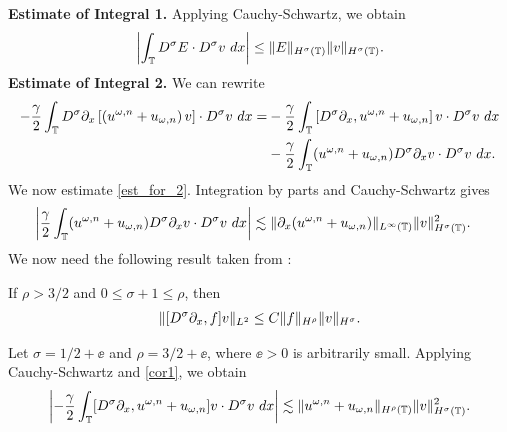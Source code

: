\textbf{Estimate of Integral 1.} Applying Cauchy-Schwartz, we obtain
%
%
\begin{equation}
\begin{split}
\left |\int_{\mathbb{T}} D^\sigma E \cdot D^\sigma v \ dx \right |
 \le \|E\|_{H^\sigma(\mathbb{T})} \|v\|_{H^\sigma(\mathbb{T})}.
\label{est_for_1}
\end{split}
\end{equation}
%
%
%
\textbf{Estimate of Integral 2.} We can rewrite
%
%
\begin{equation}
\begin{split}
-\frac{\gamma}{2} \int_{\mathbb{T}} D^\sigma \partial_x \left[ \left( u^{\omega,n} + 
u_{\omega,n}
\right)v \right] \cdot D^\sigma v \ dx
 = & -\frac{\gamma}{2}\int_{\mathbb{T}} \left[ D^\sigma \partial_x , u^{\omega,n} + 
u_{\omega,n}
\right]v \cdot D^\sigma v \ dx
\\
& - \frac{\gamma}{2} \int_{\mathbb{T}} (u^{\omega,n} + u_{\omega,n})
D^\sigma \partial_x v \cdot
D^\sigma v \ dx.
\label{est_for_2}
\end{split}
\end{equation}
%
%
We now estimate \eqref{est_for_2}. Integration 
by parts and Cauchy-Schwartz gives 
%
%
\begin{equation}
\begin{split}
\left | \frac{\gamma}{2} \int_{\mathbb{T}} (u^{\omega,n} + u_{\omega,n})
D^\sigma \partial_x v \cdot
D^\sigma v \ dx \right |
& \lesssim \|\partial_x(u^{\omega,n} + u_{\omega,n}) \|_{L^\infty(\mathbb{T})}
\|v\|_{H^\sigma(\mathbb{T})}^2.
\label{2'}
\end{split}
\end{equation}
%
%
 We now need the following result
 taken from \cite{Himonas_2009_Non-uniform-dep-per}:
%
\begin{lemma}
\label{cor1}
If $\rho > 3/2$ and $0 \le \sigma + 1 \le \rho$, then
%
%
\begin{equation}
\begin{split}
\|[D^\sigma \partial_x ,f]v\|_{L^2} \le C \|f\|_{H^\rho} \|v\|_{H^\sigma}.
\label{15}
\end{split}
\end{equation}
%
%
\end{lemma}
%
Let $\sigma = 1/2 + \ee$ and $\rho = 3/2 + \ee$, where 
$\ee > 0$ is
arbitrarily small. Applying Cauchy-Schwartz and \cref{cor1}, we obtain 
%
%
%
%
%
\begin{equation}
\begin{split}
\left | -\frac{\gamma}{2} \int_{\mathbb{T}} [D^\sigma \partial_x , u^{\omega,n} + 
u_{\omega,n}]v
\cdot D^\sigma v \ dx \right | \lesssim \|u^{\omega,n} +
u_{\omega,n}\|_{H^{\rho}(\mathbb{T})} \|v\|_{H^\sigma(\mathbb{T})}^2.
\label{7}
\end{split}
\end{equation}
